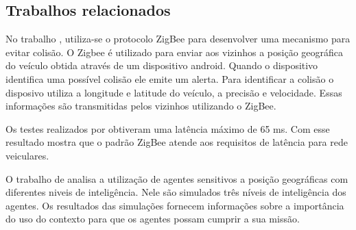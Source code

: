 \subsection{Trabalhos relacionados}

No trabalho \cite{santanaMestrado:2014}, utiliza-se o protocolo ZigBee para desenvolver uma mecanismo para evitar colisão. O Zigbee é utilizado para enviar aos vizinhos a posição geográfica do veículo obtida através de um dispositivo android. Quando o dispositivo identifica uma possível colisão ele emite um alerta. Para identificar a colisão o disposivo utiliza a longitude e latitude do veículo, a precisão e velocidade. Essas informações são transmitidas pelos vizinhos utilizando o ZigBee.

Os testes realizados por \cite{santanaMestrado:2014} obtiveram uma latência máximo de 65 ms. Com esse resultado mostra que o padrão ZigBee atende aos requisitos de latência para rede veiculares.

O trabalho de \cite{Freitas:2011} analisa a utilização de agentes sensitivos a posição geográficas com diferentes niveis de inteligência. Nele são simulados três níveis de inteligência dos agentes. Os resultados das simulações fornecem informações sobre a importância do uso do contexto para que os agentes possam cumprir a sua missão. 
